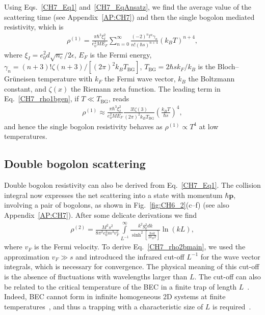 Using Eqs.~\eqref{CH7_Eq1} and~\eqref{CH7_EqAnsatz}, we find the average value of the scattering time (see Appendix~\ref{AP:CH7}) and then the single bogolon mediated resistivity, which is
%
\begin{eqnarray}
\label{CH7_rho1bgen}
\rho^{(1)}=\frac{\pi\hbar^3\xi_I^2}{e_0^2ME_F}\sum_{n=0}^\infty\frac{(-2)^nl^n\gamma_n}{n!(\hbar s)^{n+4}}(k_BT)^{n+4},
\end{eqnarray}
%
where $\xi_I= e_0^2d\sqrt{n_c}/2\epsilon$, $E_F$ is the Fermi energy, $\gamma_n=(n+3)!\zeta(n+3)/[(2\pi)^2k_BT_\textrm{BG}]$, $T_\textrm{BG}=2\hbar sk_F/k_B$ is the Bloch--Gr\"{u}neisen temperature with $k_F$ the Fermi wave vector, $k_B$ the Boltzmann constant, and $\zeta(x)$ the Riemann zeta function.
The leading term in Eq.~\eqref{CH7_rho1bgen}, if $T\ll T_\textrm{BG}$, reads
%
\begin{eqnarray}
\label{CH7_rho1b}
\rho^{(1)}\approx\frac{\pi\hbar^3\xi_I^2}{e_0^2ME_F}\frac{3!\zeta(3)}{(2\pi)^2k_BT_\textrm{BG}}\left(\frac{k_BT}{\hbar s}\right)^4,
\end{eqnarray}
%
and hence the single bogolon resistivity behaves as $\rho^{(1)}\propto T^4$ at low temperatures.

%
%
\subsection{Double bogolon scattering}
Double bogolon resistivity can also be derived from Eq.~\eqref{CH7_Eq1}. The collision integral now expresses the net scattering into a state with momentum $\hbar\mathbf{p}$, involving a pair of bogolons, as shown in Fig.~\ref{fig:CH6_2}(c--f) (see also Appendix~\ref{AP:CH7}).
After some delicate derivations we find
%
\begin{eqnarray}
\label{CH7_rho2bmain}
\rho^{(2)}=\frac{M^2s^2}{8\pi^2e_0^2m^3v_F^5}\int\limits_{L^{-1}}^\infty\frac{k^2g_k^2dk}{\sinh^2\left[\frac{\hbar sk}{2k_BT}\right]}\ln(kL),
\end{eqnarray}
%
where $v_F$ is the Fermi velocity.
To derive Eq.~\eqref{CH7_rho2bmain}, we used the approximation $v_F\gg s$ and introduced the infrared cut-off $L^{-1}$ for the wave vector integrals, which is necessary for convergence.
The physical meaning of this cut-off is the absence of fluctuations with wavelengths larger than $L$.
The cut-off can also be related to the critical temperature of the BEC in a finite trap of length $L$~\cite{Bagnato:1991aa}.
Indeed, BEC cannot form in infinite homogeneous 2D systems at finite temperatures~\cite{Hohenberg:1967aa}, and thus a trapping with a characteristic size of $L$ is required~\cite{Butov:2017aa}.

